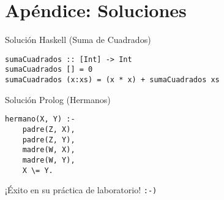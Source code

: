 \documentclass[12pt]{article}
\begin{document}
\newpage

\section*{Apéndice: Soluciones}
\begin{ejercicio}{Solución Haskell (Suma de Cuadrados)}
\begin{lstlisting}[style=haskell]
sumaCuadrados :: [Int] -> Int
sumaCuadrados [] = 0
sumaCuadrados (x:xs) = (x * x) + sumaCuadrados xs
\end{lstlisting}
\end{ejercicio}

\begin{ejercicio}{Solución Prolog (Hermanos)}
\begin{lstlisting}[style=prolog]
hermano(X, Y) :- 
    padre(Z, X), 
    padre(Z, Y), 
    madre(W, X), 
    madre(W, Y), 
    X \= Y.
\end{lstlisting}
\end{ejercicio}

\begin{center}
\Large ¡Éxito en su práctica de laboratorio! \texttt{:-)}
\end{center}
\end{document}
